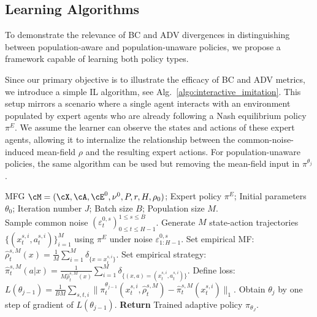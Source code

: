 \documentclass{article}
\theoremstyle{plain}
\begin{document}
\subsection{Learning Algorithms}
\label{section:learning_algorithm}
To demonstrate the relevance of BC and ADV divergences in distinguishing between population-aware and population-unaware policies, we propose a framework capable of learning both policy types. 

Since our primary objective is to illustrate the efficacy of BC and ADV metrics, we introduce a simple IL algorithm, see Alg.~\ref{algo:interactive_imitation}. This setup mirrors a scenario where a single agent interacts with an environment populated by expert agents who are already following a Nash equilibrium policy $\pi^E$. We assume the learner can observe the states and actions of these expert agents, allowing it to internalize the relationship between the common-noise-induced mean-field $\rho$ and the resulting expert actions.
For population-unaware policies, the same algorithm can be used but removing the mean-field input in $\pi^{\theta_j}$. 

\begin{algorithm}[t]
\caption{Interactive Imitation Learning for Population-aware Policies}
\begin{algorithmic}[1]
\label{algo:interactive_imitation}
\REQUIRE MFG $\cM = (\cX, \cA, \cE^0, \nu^0, P, r, H, \rho_0)$; 
Expert policy $\pi^E$; Initial parameters $\theta_0$; 
Iteration number $J$; Batch size $B$; Population size $M$. \\ 
    \STATE Sample common noise $(\varepsilon^{0, s}_t)_{0\leq t \leq H-1}^{1\leq s\leq B}$.
        \STATE Generate $M$ state-action trajectories $\{(x^{s,i}_t, a^{s,i}_t)\}_{i=1}^M$ using $\pi^E$ under noise $\varepsilon^{0,s}_{1:H-1}$.
        \STATE Set empirical MF: $\hat{\rho}^{s, M}_t(x) = \frac{1}{M}\sum_{i=1}^M \delta_{\{x = x^{s,i}_t\}}$.
        \STATE Set empirical strategy: $\hat{\pi}^{s, M}_t(a \vert x) = \frac{1}{M \hat{\rho}^{s, M}_t(x)} \sum_{i=1}^M \delta_{\{(x, a) = (x^{s,i}_t, a^{s,i}_t)\}}$.
    \ENDFOR
    \STATE Define loss: 
        $
            L(\theta_{j-1}) =
            \frac{1}{BM} 
            \sum_{s,t,i}\| \pi^{\theta_{j-1}}_t(x^{s,i}_t, \hat{\rho}^{s, M}_t) - \hat{\pi}_t^{s,M}(x^{s,i}_t) \|_1.
        $
    \STATE Obtain $\theta_j$ by one step of gradient of $L(\theta_{j-1})$.
\ENDFOR
\STATE \textbf{Return} Trained adaptive policy $\pi_{\theta_J}$.
\end{algorithmic}
\end{algorithm}
\end{document}
